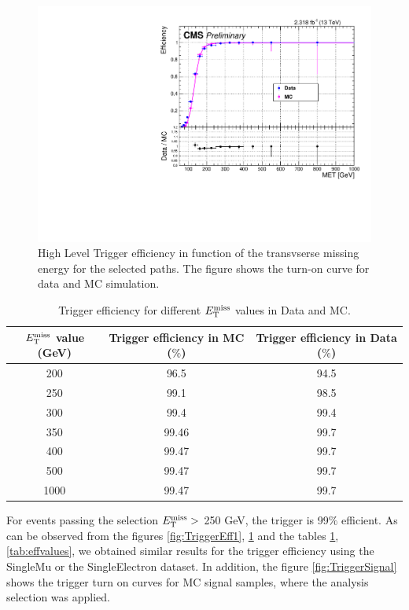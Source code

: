 \begin{figure}[!ht]
\begin{center}
  \includegraphics[width=350pt]{figures/trigger/trigeffJul18.pdf}
\end{center}
\caption{High Level Trigger efficiency in function of the transvserse missing energy for the selected paths. The figure shows the turn-on curve for data and MC simulation.}
\label{fig:TriggerEffele}
\end{figure}

\begin{table}[!ht]
\begin{center}
\caption{Trigger efficiency for different $E_{\mathrm{T}}^{\text{miss}}$ values in Data and MC.}
\label{tab:effvalues2}
\begin{tabular}{ccc} \hline
$E_{\mathrm{T}}^{\text{miss}}$ value (GeV) & Trigger efficiency in MC ($\%$)  & Trigger efficiency in Data ($\%$)  \\ \hline
200  &  96.5 & 94.5 \\
250  &  99.1  & 98.5\\
300  &  99.4 &  99.4 \\
350  &  99.46 &  99.7 \\
400  &  99.47 &  99.7 \\
500  &  99.47 & 99.7   \\
1000  &  99.47 & 99.7  \\ \hline
\end{tabular}
\end{center}
\end{table}

For events passing the selection $E_{\mathrm{T}}^{\text{miss}} >$ 250 GeV, the trigger is 99$\%$ efficient.
As can be observed  from the figures \ref{fig:TriggerEff1}, \ref{fig:TriggerEffele} and the tables \ref{tab:effvalues2}, \ref{tab:effvalues}, we obtained similar results for the trigger efficiency using the SingleMu or the SingleElectron dataset. In addition, the figure \ref{fig:TriggerSignal} shows the trigger turn on curves for MC signal samples, where the analysis selection was applied.

